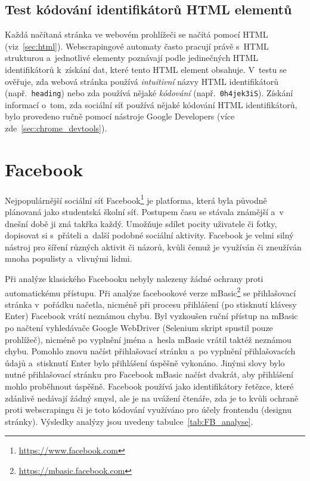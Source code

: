 \subsection*{Test kódování identifikátorů HTML elementů}
Každá načítaná stránka ve webovém prohlížeči se načítá pomocí HTML (viz~\ref{sec:html}). Webscrapingové automaty často pracují právě s~HTML strukturou a~jednotlivé elementy poznávají podle jedinečných HTML identifikátorů k~získání dat, které tento HTML element obsahuje. V~testu se ověřuje, zda webová stránka používá \textit{intuitivní} názvy HTML identifikátorů (např.~\texttt{heading}) nebo zda používá nějaké \textit{kódování} (např.~\texttt{0h4jek3iS}). Získání informací o~tom, zda sociální síť používá nějaké kódování HTML identifikátorů, bylo provedeno ručně pomocí nástroje Google Developers (více zde~\ref{sec:chrome_devtools}).

\section{Facebook}
Nejpopulárnější sociální síť Facebook\footnote{\href{https://www.facebook.com}{https://www.facebook.com}} je platforma, která byla původně plánovaná jako studentská školní síť. Postupem času se stávala známější a~v dnešní době ji zná takřka každý. Umožňuje sdílet pocity uživatele či fotky, dopisovat si s~přáteli a~další podobné sociální aktivity. Facebook je velmi silný nástroj pro šíření různých aktivit či názorů, kvůli čemuž je využíván či zneužíván mnoha populisty a~vlivnými lidmi.

Při analýze klasického Facebooku nebyly nalezeny žádné ochrany proti automatickému přístupu. Při analýze facebookové verze mBasic\footnote{\href{https://mbasic.facebook.com}{https://mbasic.facebook.com}} se přihlašovací stránka v~pořádku načetla, nicméně při procesu přihlášení (po stisknutí klávesy Enter) Facebook vrátí neznámou chybu. Byl vyzkoušen ruční přístup na mBasic po načtení vyhledávače Google WebDriver (Selenium skript spustil pouze prohlížeč), nicméně po vyplnění jména a~hesla mBasic vrátil taktéž neznámou chybu. Pomohlo znovu načíst přihlašovací stránku a~po vyplnění přihlašovacích údajů a~stisknutí Enter bylo přihlášení úspěšně vykonáno. Jinými slovy bylo nutné přihlašovací stránku pro Facebook mBasic načíst dvakrát, aby přihlášení mohlo proběhnout úspěšně. Facebook používá jako identifikátory řetězce, které zdánlivě nedávají žádný smysl, ale je na uvážení čtenáře, zda je to kvůli ochraně proti webscrapingu či je toto kódování využíváno pro účely frontendu (designu stránky). Výsledky analýzy jsou uvedeny tabulce~\ref{tab:FB_analyse}.

